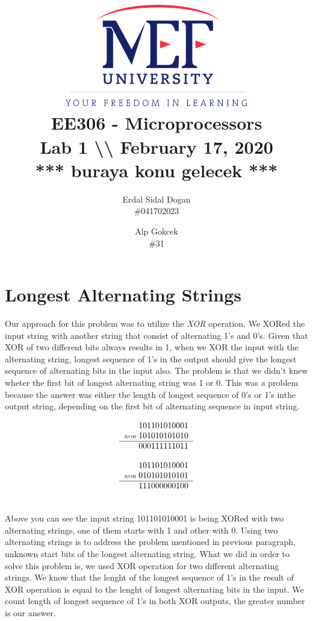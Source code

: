 \documentclass[titlepage]{article}
\date{}
\author{Erdal Sidal Dogan\\ \#041702023  \and Alp
	Gokcek \\ \#31}
\title{\includegraphics[width=0.6\textwidth]{logo_en_color.png}\\ 
\vspace{3em}
EE306 - Microprocessors\\
\vspace{2em}
\textbf{Lab 1 \textbackslash\textbackslash{}
February 17, 2020}\\
*** buraya konu gelecek ***}
\begin{document}
	\maketitle
	\section{Longest Alternating Strings}
	Our approach for this problem was to utilize the \emph{XOR} operation. We XORed the input string with another string that consist of alternating 1's and 0's. Given that XOR of two different bits always results in 1, when we XOR the input  with the alternating string, longest sequence of 1's in the output should give the longest sequence of alternating bits in the input also. The problem is that we didn't knew wheter the first bit of longest alternating string was 1 or 0.  This was a problem because the answer was either the length of longest sequence of 0's or 1's inthe output string, depending on the first bit of alternating sequence in input string.  \\
	
	\begin{minipage}{0.5\textwidth}
		\begin{equation*}
			\begin{tabular}{r@{\;}r}
				& 101101010001  \\
				\tiny{XOR} & 101010101010\\
				\hline
				& 000111111011
			\end{tabular}
		\end{equation*}
	\end{minipage}
	\quad
	\begin{minipage}{0.35\textwidth}
		\begin{equation*}
				\begin{tabular}{r@{\;}r}
				& 101101010001  \\
				\tiny{XOR} & 010101010101\\
				\hline
				& 111000000100
			\end{tabular}
		\end{equation*}
	\end{minipage}
	\\

	Above you can see the input string 101101010001 is being XORed with two alternating strings, one of them starts with 1 and other with 0. Using two alternating strings is to address the problem mentioned in previous paragraph, unknown start bits of the longest alternating string. What we did in order to solve this problem is, we used XOR operation for two different alternating strings. We know that the lenght of the longest sequence of 1's in the result of XOR operation is equal to the lenght of longest alternating bits in the input. We count length of longest sequence of 1's in both XOR outputs, the greater number is our answer.\\
	
\end{document}
